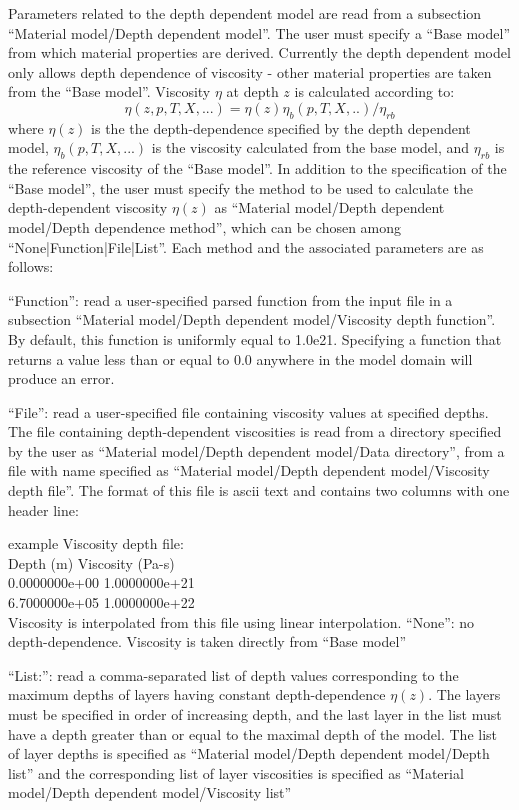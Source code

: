 \begin{itemize}
Parameters related to the depth dependent model are read from a subsection ``Material model/Depth dependent model''. The user must specify a ``Base model'' from which material properties are derived. Currently the depth dependent model only allows depth dependence of viscosity - other material properties are taken from the ``Base model''. Viscosity $\eta$ at depth $z$ is calculated according to:\begin{equation}\eta(z,p,T,X,...) = \eta(z) \eta_b(p,T,X,..)/\eta_{rb}\end{equation}where $\eta(z)$ is the the depth-dependence specified by the depth dependent model, $\eta_b(p,T,X,...)$ is the viscosity calculated from the base model, and $\eta_{rb}$ is the reference viscosity of the ``Base model''. In addition to the specification of the ``Base model'', the user must specify the method to be used to calculate the depth-dependent viscosity $\eta(z)$ as ``Material model/Depth dependent model/Depth dependence method'', which can be chosen among ``None|Function|File|List''. Each method and the associated parameters are as follows:

``Function'': read a user-specified parsed function from the input file in a subsection ``Material model/Depth dependent model/Viscosity depth function''. By default, this function is uniformly equal to 1.0e21. Specifying a function that returns a value less than or equal to 0.0 anywhere in the model domain will produce an error. 

``File'': read a user-specified file containing viscosity values at specified depths. The file containing depth-dependent viscosities is read from a directory specified by the user as ``Material model/Depth dependent model/Data directory'', from a file with name specified as ``Material model/Depth dependent model/Viscosity depth file''. The format of this file is ascii text and contains two columns with one header line:

example Viscosity depth file:\\Depth (m)    Viscosity (Pa-s)\\0.0000000e+00     1.0000000e+21\\6.7000000e+05     1.0000000e+22\\

Viscosity is interpolated from this file using linear interpolation. ``None'': no depth-dependence. Viscosity is taken directly from ``Base model''

``List:'': read a comma-separated list of depth values corresponding to the maximum depths of layers having constant depth-dependence $\eta(z)$. The layers must be specified in order of increasing depth, and the last layer in the list must have a depth greater than or equal to the maximal depth of the model. The list of layer depths is specified as ``Material model/Depth dependent model/Depth list'' and the corresponding list of layer viscosities is specified as ``Material model/Depth dependent model/Viscosity list''


\end{itemize}
